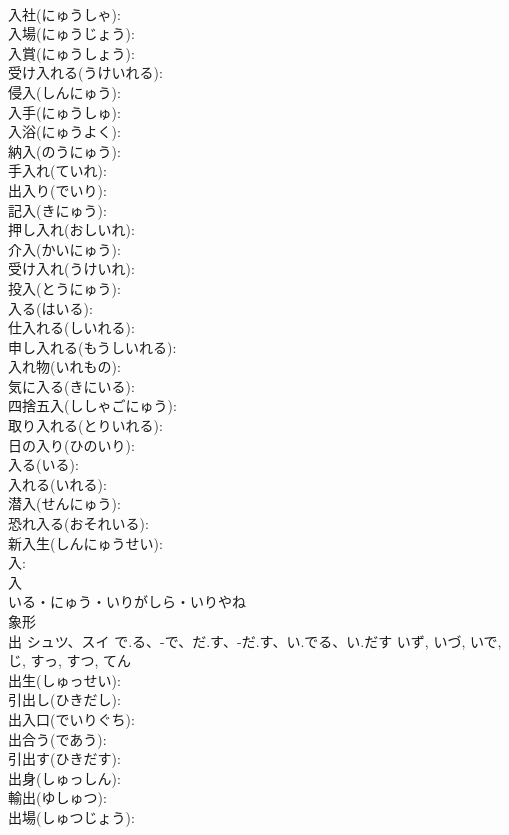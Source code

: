 \documentclass[8pt]{extreport}
\begin{document}
\begin{CJK}{UTF8}{min}
\\	入社(にゅうしゃ): 
\\	入場(にゅうじょう): 
\\	入賞(にゅうしょう): 
\\	受け入れる(うけいれる): 
\\	侵入(しんにゅう): 
\\	入手(にゅうしゅ): 
\\	入浴(にゅうよく): 
\\	納入(のうにゅう): 
\\	手入れ(ていれ): 
\\	出入り(でいり): 
\\	記入(きにゅう): 
\\	押し入れ(おしいれ): 
\\	介入(かいにゅう): 
\\	受け入れ(うけいれ): 
\\	投入(とうにゅう): 
\\	入る(はいる): 
\\	仕入れる(しいれる): 
\\	申し入れる(もうしいれる): 
\\	入れ物(いれもの): 
\\	気に入る(きにいる): 
\\	四捨五入(ししゃごにゅう): 
\\	取り入れる(とりいれる): 
\\	日の入り(ひのいり): 
\\	入る(いる): 
\\	入れる(いれる): 
\\	潜入(せんにゅう): 
\\	恐れ入る(おそれいる): 
\\	新入生(しんにゅうせい): 
\\	入: 
\\	入	
\\	いる・にゅう・いりがしら・いりやね	
\\	象形 
\\	出	シュツ、スイ	で.る、-で、だ.す、-だ.す、い.でる、い.だす	いず, いづ, いで, じ, すっ, すつ, てん	
\\	出生(しゅっせい): 
\\	引出し(ひきだし): 
\\	出入口(でいりぐち): 
\\	出合う(であう): 
\\	引出す(ひきだす): 
\\	出身(しゅっしん): 
\\	輸出(ゆしゅつ): 
\\	出場(しゅつじょう): 

\end{CJK}
\end{document}
